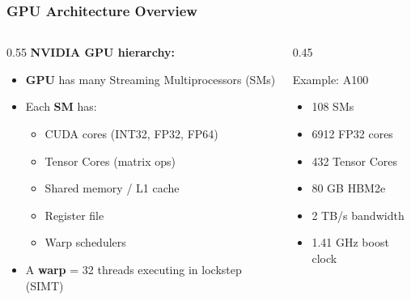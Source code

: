 \documentclass[aspectratio=169]{beamer}
\begin{document}
\begin{frame}
	\frametitle{GPU Architecture Overview}
	\begin{columns}
		\begin{column}{0.55\textwidth}
			\textbf{NVIDIA GPU hierarchy:}
			\begin{itemize}
				\item \textbf{GPU} has many \textcolor{codegreen}{Streaming Multiprocessors (SMs)}
				\item Each \textbf{SM} has:
				      \begin{itemize}
					      \item CUDA cores (INT32, FP32, FP64)
					      \item Tensor Cores (matrix ops)
					      \item Shared memory / L1 cache
					      \item Register file
					      \item Warp schedulers
				      \end{itemize}
				\item A \textbf{warp} = 32 threads executing in lockstep (SIMT)
			\end{itemize}
		\end{column}
		\begin{column}{0.45\textwidth}
			\begin{block}{Example: A100}
				\begin{itemize}
					\item 108 SMs
					\item 6912 FP32 cores
					\item 432 Tensor Cores
					\item 80 GB HBM2e
					\item 2 TB/s bandwidth
					\item 1.41 GHz boost clock
				\end{itemize}
			\end{block}
		\end{column}
	\end{columns}
\end{frame}
\end{document}
